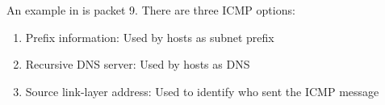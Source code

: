 An example in  is packet 9. There are three ICMP options:
\begin{enumerate}
    \item Prefix information: Used by hosts as subnet prefix
    \item Recursive DNS server: Used by hosts as DNS
    \item Source link-layer address: Used to identify who sent the ICMP message
\end{enumerate}